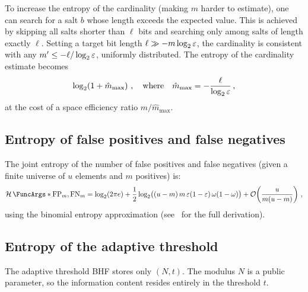 To increase the entropy of the cardinality (making $m$ harder to estimate),
one can search for a salt $b$ whose length exceeds the expected value.
This is achieved by skipping all salts shorter than $\ell$ bits and searching
only among salts of length exactly $\ell$.
Setting a target bit length $\ell \gg -m\log_2 \varepsilon$, the cardinality is
consistent with any $m' \leq -\ell / \log_2 \varepsilon$, uniformly distributed.
The entropy of the cardinality estimate becomes
\begin{equation}
    \log_2\!\left(1 + \hat{m}_{\max}\right)\,,
    \quad\text{where}\quad
    \hat{m}_{\max} = -\frac{\ell}{\log_2 \varepsilon}\,,
\end{equation}
at the cost of a space efficiency ratio $m / \hat{m}_{\max}$.

\subsection{Entropy of false positives and false negatives}

The joint entropy of the number of false positives and false negatives
(given a finite universe of $u$ elements and $m$ positives) is:
\begin{equation}
    \Entropy{\FP_m, \FN_m}
    = \log_2(2\pi e)
    + \frac{1}{2}\log_2\!\big((u-m)\,m\,\fprate(1-\fprate)\,\fnrate(1-\fnrate)\big)
    + \mathcal{O}\!\left(\frac{u}{m(u-m)}\right)\,,
\end{equation}
using the binomial entropy approximation (see~\cite{bernoulli_sets} for the
full derivation).

\subsection{Entropy of the adaptive threshold}
\label{sec:adaptive_entropy}

The adaptive threshold BHF stores only $(N, t)$.
The modulus $N$ is a public parameter, so the information content resides
entirely in the threshold $t$.

